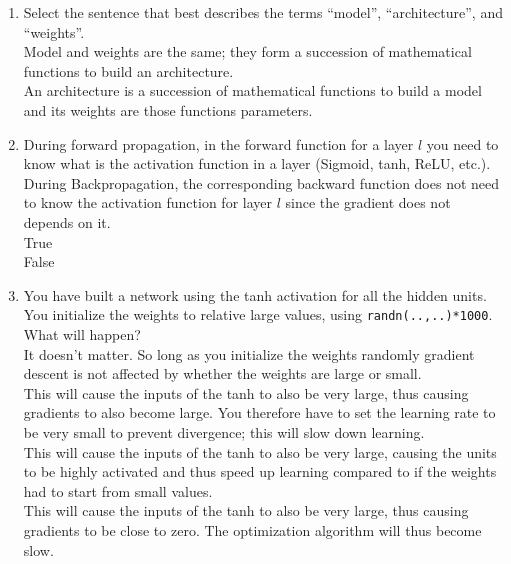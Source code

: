 \begin{enumerate}
        \item Select the sentence that best describes the terms ``model'', ``architecture'', and ``weights''. \\ 
        \hspace{1cm}\choice{} Model and weights are the same; they form a succession of mathematical functions to build an architecture. \\ 
        \hspace{1cm}\checkmark An architecture is a succession of mathematical functions to build a model and its weights are those functions parameters. \\ 
        \solution{}
    
    \item  During forward propagation, in the forward function for a layer $l$ you need to know what is the activation function in a layer (Sigmoid, tanh, ReLU, etc.). During Backpropagation, the corresponding backward function does not need to know the activation function for layer $l$ since the gradient does not depends on it. \\
        \hspace{1cm}\choice{} True \\
        \hspace{1cm}\checkmark False \\ 
        \solution{}

    \item You have built a network using the tanh activation for all the hidden units. You initialize the weights to relative large values, using {\tt randn(..,..)*1000}. What will happen?  \\ 
    \hspace{1cm}\choice{} It doesn't matter. So long as you initialize the weights randomly gradient descent is not affected by whether the weights are large or small. \\ 
    \hspace{1cm}\choice{} This will cause the inputs of the tanh to also be very large, thus causing gradients to also become large. You therefore have to set the learning rate to be very small to prevent divergence; this will slow down learning.\\ 
    \hspace{1cm}\choice{}  This will cause the inputs of the tanh to also be very large, causing the units to be highly activated and thus speed up learning compared to if the weights had to start from small values. \\ 
    \hspace{1cm}\checkmark  This will cause the inputs of the tanh to also be very large, thus causing gradients to be close to zero. The optimization algorithm will thus become slow. \\ 
    \solution{}


\end{enumerate}
